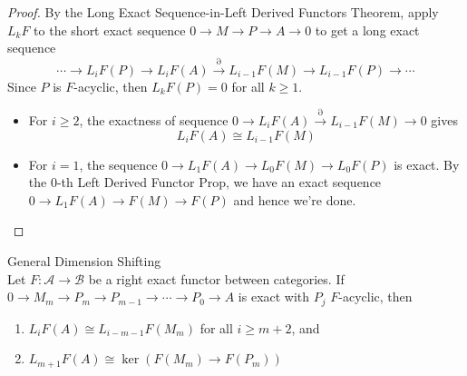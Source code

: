 \begin{proof}
    By the Long Exact Sequence-in-Left Derived Functors Theorem, apply $L_kF$ to the short exact sequence $0\to M\to P\to A\to0$ to get a long exact sequence
    \[
    \cdots \to L_iF(P) \to L_iF(A) \xrightarrow{\partial} L_{i-1} F(M) \to L_{i-1} F(P) \to \cdots
    \]
    Since $P$ is $F$-acyclic, then $L_kF(P)=0$ for all $k\geq 1$.
    \begin{itemize}
        \item For $i\geq 2$, the exactness of sequence $0\to L_iF(A) \xrightarrow{\partial} L_{i-1}F(M) \to 0$ gives
        \[
        L_iF(A) \cong L_{i-1} F(M)
        \]

        \item For $i=1$, the sequence $0\to L_1F(A) \to L_0F(M) \to L_0F(P)$ is exact. By the $0$-th Left Derived Functor Prop, we have an exact sequence $0\to L_1F(A) \to F(M) \to F(P)$ and hence we're done.
    \end{itemize}
\end{proof}

\begin{theorem}{General Dimension Shifting}\\
Let $F:\mathcal{A} \to \mathcal{B}$ be a right exact functor between categories. If $0\to M_m \to P_m\to P_{m-1} \to \cdots \to P_0 \to A$ is exact with $P_j$ $F$-acyclic, then
\begin{enumerate}
    \item $L_iF(A) \cong L_{i-m-1} F(M_m)$ for all $i\geq m+2$, and
    \item $L_{m+1} F(A) \cong \ker (F(M_m) \to F(P_m))$
\end{enumerate}
\end{theorem}

